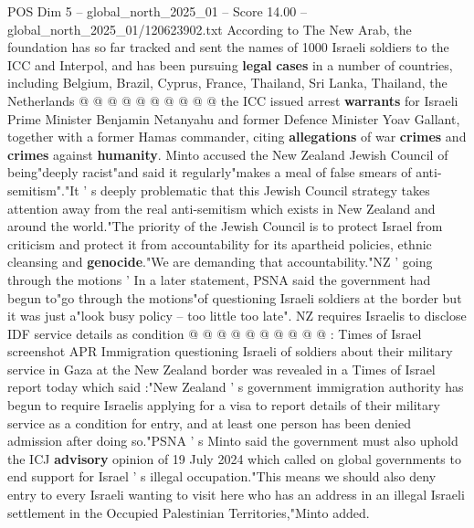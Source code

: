 \begin{textsample}{POS Dim 5 – global\_north\_2025\_01 – Score 14.00 – global\_north\_2025\_01/120623902.txt}
According to The New Arab, the foundation has so far tracked and sent the names of 1000 Israeli soldiers to the ICC and Interpol, and has been pursuing \textbf{legal} \textbf{cases} in a number of countries, including Belgium, Brazil, Cyprus, France, Thailand, Sri Lanka, Thailand, the Netherlands @ @ @ @ @ @ @ @ @ @ the ICC issued arrest \textbf{warrants} for Israeli Prime Minister Benjamin Netanyahu and former Defence Minister Yoav Gallant, together with a former Hamas commander, citing \textbf{allegations} of war \textbf{crimes} and \textbf{crimes} against \textbf{humanity}.
Minto accused the New Zealand Jewish Council of being"deeply racist"and said it regularly"makes a meal of false smears of anti-semitism"."It ' s deeply problematic that this Jewish Council strategy takes attention away from the real anti-semitism which exists in New Zealand and around the world."The priority of the Jewish Council is to protect Israel from criticism and protect it from accountability for its apartheid policies, ethnic cleansing and \textbf{genocide}."We are demanding that accountability."NZ ' going through the motions ' In a later statement, PSNA said the government had begun to"go through the motions"of questioning Israeli soldiers at the border but it was just a"look busy policy -- too little too late".
NZ requires Israelis to disclose IDF service details as condition @ @ @ @ @ @ @ @ @ @ : Times of Israel screenshot APR Immigration questioning Israeli of soldiers about their military service in Gaza at the New Zealand border was revealed in a Times of Israel report today which said :"New Zealand ' s government immigration authority has begun to require Israelis applying for a visa to report details of their military service as a condition for entry, and at least one person has been denied admission after doing so."PSNA ' s Minto said the government must also uphold the ICJ \textbf{advisory} opinion of 19 July 2024 which called on global governments to end support for Israel ' s illegal occupation."This means we should also deny entry to every Israeli wanting to visit here who has an address in an illegal Israeli settlement in the Occupied Palestinian Territories,"Minto added.

\end{textsample}
